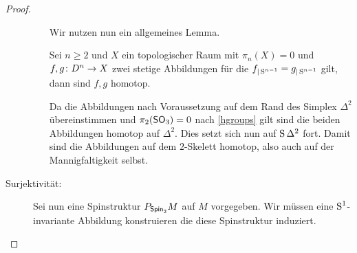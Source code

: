\begin{Satz}
\begin{proof}
\begin{description}
\begin{enumerate}
			          	Wir nutzen nun ein allgemeines Lemma.
			          	
			          	\begin{Lem}
		          		Sei $ n\geq 2 $ und $ X $ ein topologischer Raum mit
		          		$ \pi_n(X)=0 $ und 
		          		$ \abb{f,g}{D^n}{X} $ zwei stetige Abbildungen
		          		für die $ f_{|\S^{n-1}} = g_{|\S^{n-1}} $ gilt, dann
		          		sind $ f,g $ homotop.
			          	\end{Lem}
			          	
			          	Da die Abbildungen nach Voraussetzung auf 
			          	dem Rand des Simplex $ \Delta^2 $ übereinstimmen
			          	und $ \pi_2(\so_3)=0 $ nach \cref{hgroups} gilt sind die beiden
			          	Abbildungen homotop auf $ \Delta^2 $. Dies setzt
			          	sich nun auf $ \S \Delta^2 $ fort. Damit sind
			          	die Abbildungen auf dem $ 2 $-Skelett homotop, 
			          	also auch auf der Mannigfaltigkeit selbst.
		          	\end{enumerate}
		  \item[Surjektivität:] Sei nun eine Spinstruktur $ \Ph{\spin_2}{M} $ auf $ M $
		  vorgegeben. Wir müssen eine $ \S^1 $-invariante Abbildung
		  konstruieren die diese Spinstruktur induziert.
		  

\end{description}
\end{proof}
\end{Satz}
